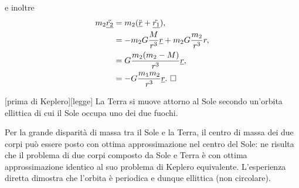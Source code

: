e inoltre
\begin{align*}
	m_2 \ddot{\underline{r_2}}
	&= m_2 (\ddot{\underline{r}} + \ddot{\underline{r_1}}),\\
	&= - m_2 G \frac{M}{r^3}\underline{r} + m_2 G \frac{m_2}{r^3}{r},\\
	&= G \frac{m_2(m_2 - M)}{r^3}\underline{r},\\
	&= - G \frac{m_1m_2}{r^3}\underline{r}.\text{ $\square$}
\end{align*}
\begin{Corollary}
	[prima di Keplero][legge] La Terra si muove attorno al Sole secondo un'orbita ellittica di cui il Sole occupa uno dei due fuochi.
\end{Corollary}
\Proof Per la grande disparit\`a di massa tra il Sole e la Terra, il centro di massa dei due corpi pu\`o essere posto con ottima approssimazione nel centro del Sole: ne risulta che il problema di due corpi composto da Sole e Terra \`e con ottima approssimazione identico al suo problema di Keplero equivalente. L'esperienza diretta dimostra che l'orbita \`e periodica e dunque ellittica (non circolare). \EndProof
